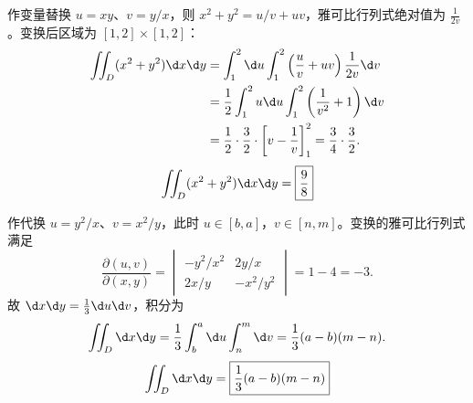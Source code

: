 \begin{solution}
    作变量替换 $u = xy$、$v = y/x$，则 $x^2+y^2 = u/v + uv$，雅可比行列式绝对值为 $\frac{1}{2v}$。变换后区域为 $[1, 2] \times [1, 2]$：
    \begin{equation}
        \begin{aligned}
            \iint_D (x^2+y^2) \d x \d y & = \int_1^2 \d u \int_1^2 \left( \frac{u}{v} + uv \right) \frac{1}{2v} \d v                                \\
                                        & = \frac{1}{2} \int_1^2 u \d u \int_1^2 \left( \frac{1}{v^2} + 1 \right) \d v \label{eq:int-3-step}        \\
                                        & = \frac{1}{2} \cdot \frac{3}{2} \cdot \left[ v - \frac{1}{v} \right]_1^2 = \frac{3}{4} \cdot \frac{3}{2}.
        \end{aligned}
    \end{equation}
    \begin{equation}
        \iint_D (x^2+y^2) \d x \d y = \boxed{\frac{9}{8}}
    \end{equation}


    作代换 $u = y^2/x$、$v = x^2/y$，此时 $u \in [b, a]$，$v \in [n, m]$。变换的雅可比行列式满足
    \begin{equation}
        \frac{\partial(u,v)}{\partial(x,y)} = \begin{vmatrix} -y^2/x^2 & 2y/x \\ 2x/y & -x^2/y^2 \end{vmatrix} = 1 - 4 = -3.
    \end{equation}
    故 $\d x \d y = \frac{1}{3} \d u \d v$，积分为
    \begin{equation}
        \iint_D \d x \d y = \frac{1}{3} \int_b^a \d u \int_n^m \d v = \frac{1}{3}(a-b)(m-n).
    \end{equation}
    \begin{equation}
        \iint_D \d x \d y = \boxed{\frac{1}{3}(a-b)(m-n)}
    \end{equation}



\end{solution}
